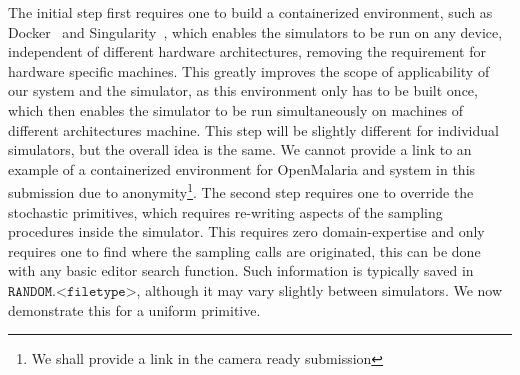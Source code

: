 \documentclass{article}
\begin{document}
The initial step first requires one to build a containerized environment, such as Docker~\cite{merkel2014docker} and Singularity~\cite{kurtzer2017singularity}, which enables the simulators to be run on any device, independent of different hardware architectures, removing the requirement for hardware specific machines. 
This greatly improves the scope of applicability of our system and the simulator, as this environment only has to be built once, which then enables the simulator to be run simultaneously on machines of different architectures machine. This step will be slightly different for individual simulators, but the overall idea is the same. We cannot provide a link to an example of a containerized environment for OpenMalaria and system in this submission due to anonymity\footnote{We shall provide a link in the camera ready submission}.
The second step requires one to override the stochastic primitives, which requires re-writing aspects of the sampling procedures inside the simulator. 
This requires zero domain-expertise and only requires one to find where the sampling calls are originated, this can be done with any basic editor search function.
 Such information is typically saved in $\texttt{RANDOM.<filetype>}$, although it may vary slightly between simulators. We now demonstrate this for a uniform primitive.
\end{document}
